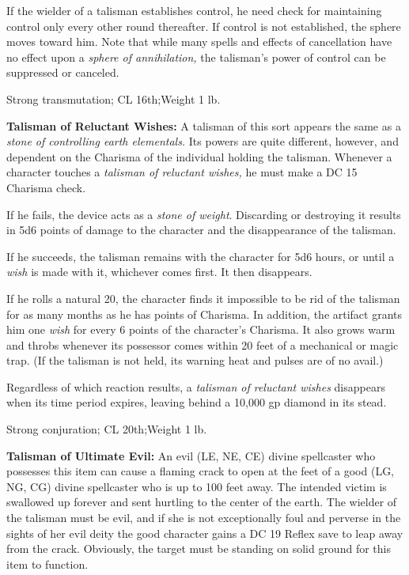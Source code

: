 If the wielder of a talisman establishes control, he need check for maintaining 
control only every other round thereafter. If control is not established, the sphere 
moves toward him. Note that while many spells and effects of cancellation have 
no effect upon a \textit{sphere of annihilation, }the talisman's power of control 
can be suppressed or canceled.

Strong transmutation; CL 16th;Weight 1 lb.

\vspace{12pt}
\textbf{Talisman of Reluctant Wishes: }A talisman of this sort appears the same 
as a \textit{stone of controlling earth elementals. }Its powers are quite different, 
however, and dependent on the Charisma of the individual holding the talisman. 
Whenever a character touches a \textit{talisman of reluctant wishes, }he must make 
a DC 15 Charisma check. 

If he fails, the device acts as a \textit{stone of weight}. Discarding or destroying 
it results in 5d6 points of damage to the character and the disappearance of the 
talisman. 

If he succeeds, the talisman remains with the character for 5d6 hours, or until 
a \textit{wish }is made with it, whichever comes first. It then disappears.

If he rolls a natural 20, the character finds it impossible to be rid of the talisman 
for as many months as he has points of Charisma. In addition, the artifact grants 
him one \textit{wish }for every 6 points of the character's Charisma. It also grows 
warm and throbs whenever its possessor comes within 20 feet of a mechanical or 
magic trap. (If the talisman is not held, its warning heat and pulses are of no 
avail.)

Regardless of which reaction results, a \textit{talisman of reluctant wishes }disappears 
when its time period expires, leaving behind a 10,000 gp diamond in its stead.

Strong conjuration; CL 20th;Weight 1 lb.

\vspace{12pt}
\textbf{Talisman of Ultimate Evil:} An evil (LE, NE, CE) divine spellcaster who 
possesses this item can cause a flaming crack to open at the feet of a good (LG, 
NG, CG) divine spellcaster who is up to 100 feet away. The intended victim is swallowed 
up forever and sent hurtling to the center of the earth. The wielder of the talisman 
must be evil, and if she is not exceptionally foul and perverse in the sights of 
her evil deity the good character gains a DC 19 Reflex save to leap away from the 
crack. Obviously, the target must be standing on solid ground for this item to 
function. 

